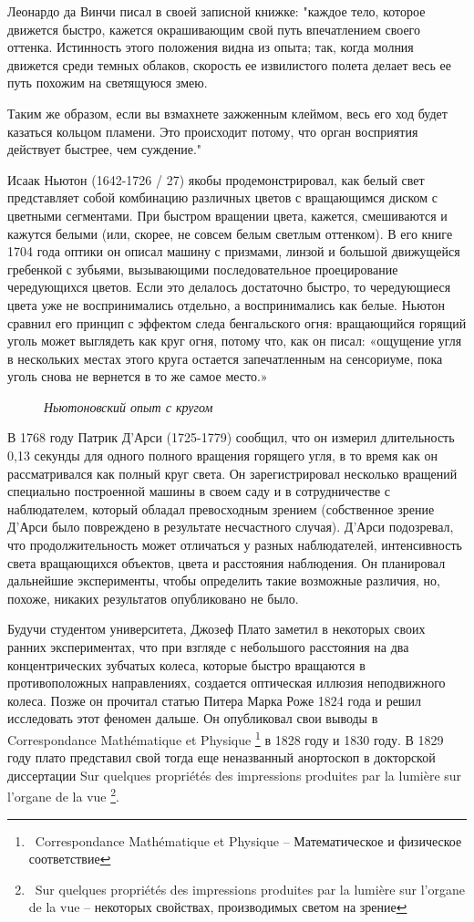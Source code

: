 \documentclass[a4paper, 12pt]{article}
\newcommand{\image}[3]{
	\begin{figure}[ht]
		\center{\texttt{[image: img/\#1]} }
		\caption{\textit{#3}}\end{figure}
}
\begin{document}
Леонардо да Винчи писал в своей записной книжке: "каждое тело,
которое движется быстро, кажется окрашивающим свой путь
впечатлением своего оттенка. Истинность этого положения видна из
опыта; так, когда молния движется среди темных облаков, скорость ее
извилистого полета делает весь ее путь похожим на светящуюся змею.

Таким же образом, если вы взмахнете зажженным клеймом, весь его
ход будет казаться кольцом пламени. Это происходит потому, что
орган восприятия действует быстрее, чем суждение."

Исаак Ньютон (1642-1726 / 27) якобы продемонстрировал, как
белый свет представляет собой комбинацию различных цветов с
вращающимся диском с цветными сегментами. При быстром вращении
цвета, кажется, смешиваются и кажутся белыми (или, скорее, не
совсем белым светлым оттенком). В его книге 1704 года оптики он
описал машину с призмами, линзой и большой движущейся гребенкой с
зубьями, вызывающими последовательное проецирование
чередующихся цветов. Если это делалось достаточно быстро, то
чередующиеся цвета уже не воспринимались отдельно, а
воспринимались как белые. Ньютон сравнил его принцип с эффектом
следа бенгальского огня: вращающийся горящий уголь может
выглядеть как круг огня, потому что, как он писал: «ощущение угля в
нескольких местах этого круга остается запечатленным на сенсориуме,
пока уголь снова не вернется в то же самое место.»

\image{круг.png}{200}{Ньютоновский опыт с кругом}
В 1768 году Патрик Д'Арси (1725-1779) сообщил, что он измерил
длительность 0,13 секунды для одного полного вращения горящего
угля, в то время как он рассматривался как полный круг света. Он
зарегистрировал несколько вращений специально построенной машины
в своем саду и в сотрудничестве с наблюдателем, который обладал
превосходным зрением (собственное зрение Д'Арси было повреждено в
результате несчастного случая). Д'Арси подозревал, что
продолжительность может отличаться у разных наблюдателей,
интенсивность света вращающихся объектов, цвета и расстояния
наблюдения. Он планировал дальнейшие эксперименты, чтобы
определить такие возможные различия, но, похоже, никаких
результатов опубликовано не было.

Будучи студентом университета, Джозеф Плато заметил в
некоторых своих ранних экспериментах, что при взгляде с небольшого
расстояния на два концентрических зубчатых колеса, которые быстро
вращаются в противоположных направлениях, создается оптическая
иллюзия неподвижного колеса. Позже он прочитал статью Питера
Марка Роже 1824 года и решил исследовать этот феномен дальше. Он
опубликовал свои выводы в Correspondance Mathématique et Physique
\footnote{\ Correspondance Mathématique et Physique -- Математическое и физическое соответствие}
в 1828 году и 1830 году. В 1829 году плато представил свой тогда еще
неназванный анортоскоп в докторской диссертации Sur quelques
propriétés des impressions produites par la lumière sur l'organe de la vue
\footnote{\ Sur quelques
  propriétés des impressions produites par la lumière sur l'organe de la vue --
  некоторых свойствах, производимых светом на зрение}.
\end{document}
